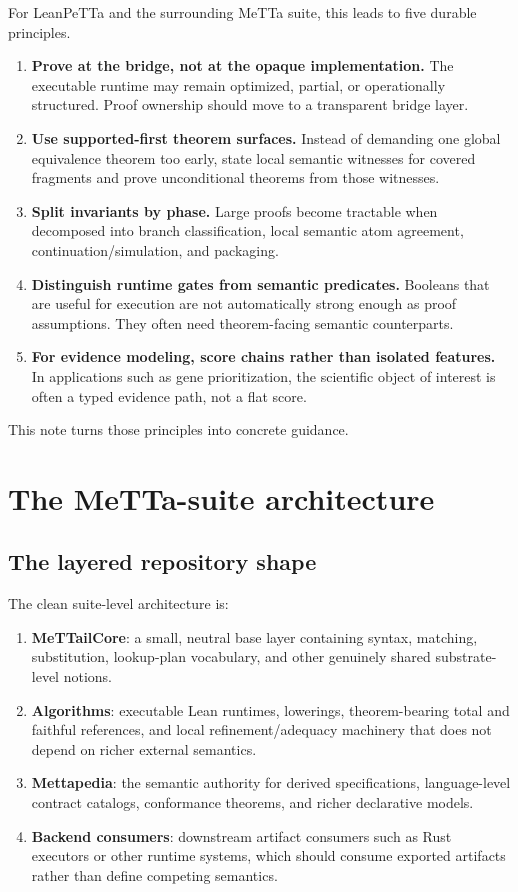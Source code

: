 \documentclass[11pt]{article}
\begin{document}
For LeanPeTTa and the surrounding MeTTa suite, this leads to five durable principles.

\begin{enumerate}
  \item \textbf{Prove at the bridge, not at the opaque implementation.} The executable runtime may remain optimized, partial, or operationally structured. Proof ownership should move to a transparent bridge layer.
  \item \textbf{Use supported-first theorem surfaces.} Instead of demanding one global equivalence theorem too early, state local semantic witnesses for covered fragments and prove unconditional theorems from those witnesses.
  \item \textbf{Split invariants by phase.} Large proofs become tractable when decomposed into branch classification, local semantic atom agreement, continuation/simulation, and packaging.
  \item \textbf{Distinguish runtime gates from semantic predicates.} Booleans that are useful for execution are not automatically strong enough as proof assumptions. They often need theorem-facing semantic counterparts.
  \item \textbf{For evidence modeling, score chains rather than isolated features.} In applications such as gene prioritization, the scientific object of interest is often a typed evidence path, not a flat score.
\end{enumerate}

This note turns those principles into concrete guidance.

\section{The MeTTa-suite architecture}

\subsection{The layered repository shape}

The clean suite-level architecture is:

\begin{enumerate}
  \item \textbf{MeTTailCore}: a small, neutral base layer containing syntax, matching, substitution, lookup-plan vocabulary, and other genuinely shared substrate-level notions.
  \item \textbf{Algorithms}: executable Lean runtimes, lowerings, theorem-bearing total and faithful references, and local refinement/adequacy machinery that does not depend on richer external semantics.
  \item \textbf{Mettapedia}: the semantic authority for derived specifications, language-level contract catalogs, conformance theorems, and richer declarative models.
  \item \textbf{Backend consumers}: downstream artifact consumers such as Rust executors or other runtime systems, which should consume exported artifacts rather than define competing semantics.
\end{enumerate}
\end{document}
